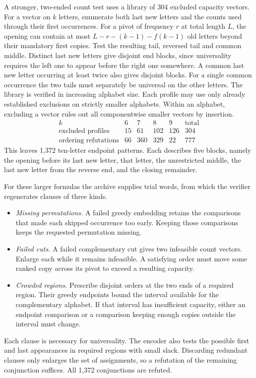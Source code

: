 \documentclass[11pt]{article}
\begin{document}
A stronger, two-ended count test uses a library of 304 excluded capacity vectors. For a vector on $k$ letters, enumerate both last new letters and the counts used through their first occurrences. For a pivot of frequency $r$ at total length $L$, the opening can contain at most $L-r-(k-1)-f(k-1)$ old letters beyond their mandatory first copies. Test the resulting tail, reversed tail and common middle. Distinct last new letters give disjoint end blocks, since universality requires the left one to appear before the right one somewhere. A common last new letter occurring at least twice also gives disjoint blocks. For a single common occurrence the two tails must separately be universal on the other letters. The library is verified in increasing alphabet size. Each profile may use only already established exclusions on strictly smaller alphabets. Within an alphabet, excluding a vector rules out all componentwise smaller vectors by insertion.
\[
\begin{array}{c|rrrr|r}
k&6&7&8&9&\text{total}\\ \hline
\text{excluded profiles}&15&61&102&126&304\\
\text{ordering refutations}&66&360&329&22&777
\end{array}
\]
This leaves 1,372 ten-letter endpoint patterns. Each describes five blocks, namely the opening before its last new letter, that letter, the unrestricted middle, the last new letter from the reverse end, and the closing remainder.

For these larger formulas the archive supplies trial words, from which the verifier regenerates clauses of three kinds.
\begin{itemize}
\item \emph{Missing permutations.} A failed greedy embedding retains the comparisons that made each skipped occurrence too early. Keeping those comparisons keeps the requested permutation missing.
\item \emph{Failed cuts.} A failed complementary cut gives two infeasible count vectors. Enlarge each while it remains infeasible. A satisfying order must move some ranked copy across its pivot to exceed a resulting capacity.
\item \emph{Crowded regions.} Prescribe disjoint orders at the two ends of a required region. Their greedy endpoints bound the interval available for the complementary alphabet. If that interval has insufficient capacity, either an endpoint comparison or a comparison keeping enough copies outside the interval must change.
\end{itemize}
Each clause is necessary for universality. The encoder also tests the possible first and last appearances in required regions with small slack. Discarding redundant clauses only enlarges the set of assignments, so a refutation of the remaining conjunction suffices. All 1,372 conjunctions are refuted.
\end{document}
